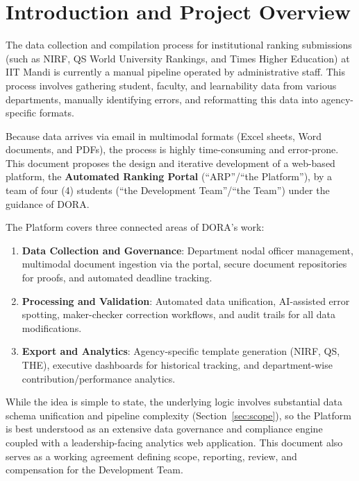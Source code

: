 \documentclass[11pt]{article}
\begin{document}
\tableofcontents
\clearpage

\section{Introduction and Project Overview}
The data collection and compilation process for institutional ranking submissions (such as NIRF, QS World University Rankings, and Times Higher Education) at IIT Mandi is currently a manual pipeline operated by administrative staff. This process involves gathering student, faculty, and learnability data from various departments, manually identifying errors, and reformatting this data into agency-specific formats.

Because data arrives via email in multimodal formats (Excel sheets, Word documents, and PDFs), the process is highly time-consuming and error-prone. This document proposes the design and iterative development of a web-based platform, the \textbf{Automated Ranking Portal} (``ARP''/``the Platform''), by a team of four (4) students (``the Development Team''/``the Team'') under the guidance of DORA.

The Platform covers three connected areas of DORA's work:
\begin{enumerate}[leftmargin=1.6em, itemsep=3pt]
\item \textbf{Data Collection and Governance}: Department nodal officer management, multimodal document ingestion via the portal, secure document repositories for proofs, and automated deadline tracking.
\item \textbf{Processing and Validation}: Automated data unification, AI-assisted error spotting, maker-checker correction workflows, and audit trails for all data modifications.
\item \textbf{Export and Analytics}: Agency-specific template generation (NIRF, QS, THE), executive dashboards for historical tracking, and department-wise contribution/performance analytics.
\end{enumerate}

While the idea is simple to state, the underlying logic involves substantial data schema unification and pipeline complexity (Section~\ref{sec:scope}), so the Platform is best understood as an extensive data governance and compliance engine coupled with a leadership-facing analytics web application. This document also serves as a working agreement defining scope, reporting, review, and compensation for the Development Team.
\end{document}
